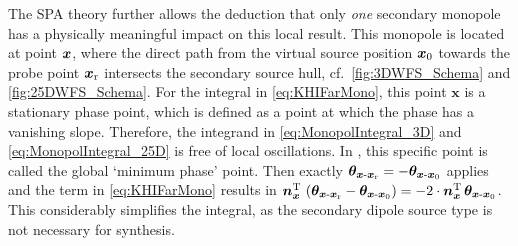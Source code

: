 The SPA theory further allows the deduction that only \textit{one}
secondary monopole has a physically meaningful impact on this local result.
%
This monopole is located at point $\bm{x}$, where the direct path from the
virtual source position $\bm{x}_\mathrm{0}$ towards the probe point $\bm{x}_\mathrm{r}$ intersects
the secondary source hull, cf.~\myfigs\ref{fig:3DWFS_Schema} and
\ref{fig:25DWFS_Schema}.
%
For the integral in \myeq\eqref{eq:KHIFarMono}, this point $\bm{x}$
is a stationary phase point, which is defined as a point at which the phase
has a vanishing slope.
Therefore, the integrand in \eqref{eq:MonopolIntegral_3D} and
\eqref{eq:MonopolIntegral_25D} is free of local oscillations.
%
In \cite[Ch.~3.3]{Start1997_diss}, this specific point is called
the global `minimum phase' point.  %
%
Then exactly $\bm{\theta}_{\bm{x}\text{-}\bm{x}_\mathrm{r}} = -\bm{\theta}_{\bm{x}\text{-}\bm{x}_\mathrm{0}}$ applies
and the term in \myeq\eqref{eq:KHIFarMono} results in
$\bm{n}^\mathrm{T}_{\bm{x}} \, \left(\bm{\theta}_{\bm{x}\text{-}\bm{x}_\mathrm{r}} - \bm{\theta}_{\bm{x}\text{-}\bm{x}_\mathrm{0}}\right)
= - 2 \cdot \bm{n}^\mathrm{T}_{\bm{x}} \, \bm{\theta}_{\bm{x}\text{-}\bm{x}_\mathrm{0}}$.
%
This considerably simplifies the integral, as the secondary dipole source type
is not necessary for synthesis.



